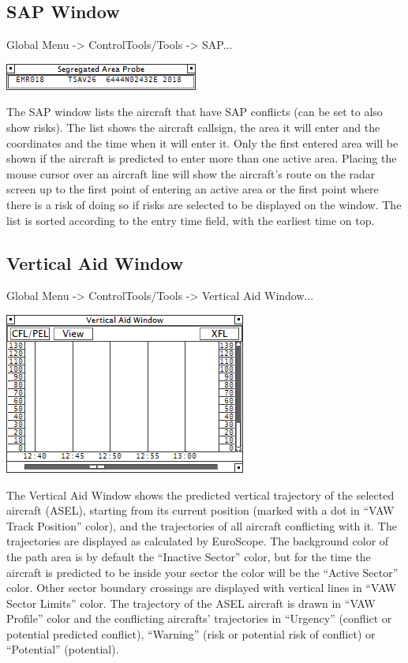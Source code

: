 \documentclass[11pt,a4paper,oldfontcommands]{memoir}
\begin{document}
\subsection{SAP Window}
\label{win:sap}

Global Menu -> ControlTools/Tools -> SAP...

\includegraphics{img/sap.png}

The SAP window lists the aircraft that have SAP conflicts (can be set to also show risks). The list shows the aircraft callsign, the area it will enter and the coordinates and the time when it will enter it. Only the first entered area will be shown if the aircraft is predicted to enter more than one active area. Placing the mouse cursor over an aircraft line will show the aircraft’s route on the radar screen up to the first point of entering an active area or the first point where there is a risk of doing so if risks are selected to be displayed on the window. The list is sorted according to the entry time field, with the earliest time on top.

\subsection{Vertical Aid Window}
\label{win:vaw}

Global Menu -> ControlTools/Tools -> Vertical Aid Window...

\includegraphics{img/vaw.png}

The Vertical Aid Window shows the predicted vertical trajectory of the selected aircraft (ASEL), starting from its current position (marked with a dot in “VAW Track Position” color), and the trajectories of all aircraft conflicting with it. The trajectories are displayed as calculated by EuroScope. The background color of the path area is by default the “Inactive Sector” color, but for the time the aircraft is predicted to be inside your sector the color will be the “Active Sector” color. Other sector boundary crossings are displayed with vertical lines in “VAW Sector Limits” color. The trajectory of the ASEL aircraft is drawn in “VAW Profile” color and the conflicting aircrafts’ trajectories in “Urgency” (conflict or potential predicted conflict), “Warning” (risk or potential risk of conflict) or “Potential” (potential).
\end{document}

